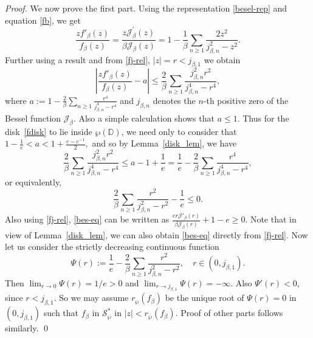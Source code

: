 \documentclass[12pt, reqno]{amsart}
\numberwithin{equation}{section}
\theoremstyle{plain}
\theoremstyle{definition}
\theoremstyle{remark}
\begin{document}
\begin{proof}We now prove the first part. Using the representation \eqref{besel-rep} and equation \eqref{fb}, we get
	\begin{equation}\label{fj-rel}
	\frac{zf'_{\beta}(z)}{f_{\beta}(z)}=\frac{z\mathcal{J}^{'}_{\beta}(z)}{\beta\mathcal{J}_{\beta}(z)}=1-\frac{1}{\beta}\sum_{n\geq1}\frac{2z^2}{j^2_{\beta,n}-z^2}.
	\end{equation} 
	Further using a result \cite[Lemma~3.2, p.~10]{ganga1997} and from \eqref{fj-rel}, $|z|=r<j_{\beta,1}$ we obtain 
	\begin{equation}\label{fdisk}
	\left|\frac{zf'_{\beta}(z)}{f_{\beta}(z)}-a\right| \leq \frac{2}{\beta}\sum_{n\geq1}\frac{j^2_{\beta,n}r^2}{j^4_{\beta,n}-r^4},
	\end{equation}
	where $a:=1-\frac{2}{\beta}\sum_{n\geq1}\frac{r^4}{j^4_{\beta,n}-r^4}$ and $j_{\beta,n}$ denotes the $n$-th positive zero of the Bessel function $\mathcal{J}_{\beta}$. Also a simple calculation shows that $a\leq1$. Thus for the disk~\eqref{fdisk} to lie inside $\wp(\mathbb{D})$, we need only to consider that $1-\tfrac{1}{e}<a<1+\tfrac{e-e^{-1}}{2},$ and so by Lemma~\ref{disk_lem}, we have
	$$\frac{2}{\beta}\sum_{n\geq1}\frac{j^2_{\beta,n}r^2}{j^4_{\beta,n}-r^4}\leq a-1+\frac{1}{e}=\frac{1}{e}-\frac{2}{\beta}\sum_{n\geq1}\frac{r^4}{j^4_{\beta,n}-r^4},$$
	or equivalently,
	\begin{equation}\label{bes-eq}
	\frac{2}{\beta}\sum_{n\geq1}\frac{r^2}{j^2_{\beta,n}-r^2}-\frac{1}{e}\leq0.
	\end{equation}
	Also using \eqref{fj-rel}, \eqref{bes-eq} can be written as $\frac{er\mathcal{J}'_{\beta}(r)}{\beta\mathcal{J}_{\beta}(r)}+1-e\geq0$. Note that in view of Lemma~\ref{disk_lem}, we can also obtain \eqref{bes-eq} directly from \eqref{fj-rel}. Now let us consider the strictly decreasing continuous function
	$$\Psi(r):=\frac{1}{e}-\frac{2}{\beta}\sum_{n\geq1}\frac{r^2}{j^2_{\beta,n}-r^2}, \quad  r\in (0,j_{\beta,1}).$$
	Then $\lim_{r\rightarrow0}\Psi(r)=1/e>0$ and $\lim_{r\rightarrow j_{\beta,1}}\Psi(r)=-\infty$. Also $\Psi'(r)<0$, since $r<j_{\beta,1}$. So we may assume $r_{\wp}(f_{\beta})$ be the unique root of $\Psi(r)=0$ in $(0,j_{\beta,1})$ such that $f_{\beta}$ in $\mathcal{S}^*_{\wp}$ in $|z|<r_{\wp}(f_{\beta})$. Proof of other parts follows similarly. \qed
	
\end{proof}
\end{document}
